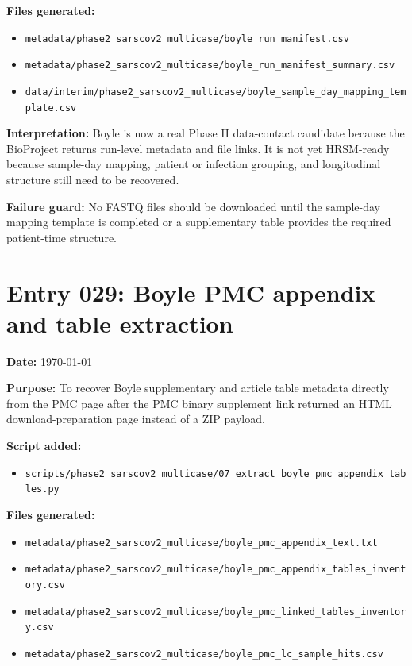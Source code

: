 \textbf{Files generated:}
\begin{itemize}
    \item \texttt{metadata/phase2\_sarscov2\_multicase/boyle\_run\_manifest.csv}
    \item \texttt{metadata/phase2\_sarscov2\_multicase/boyle\_run\_manifest\_summary.csv}
    \item \texttt{data/interim/phase2\_sarscov2\_multicase/boyle\_sample\_day\_mapping\_template.csv}
\end{itemize}

\textbf{Interpretation:} Boyle is now a real Phase II data-contact candidate because the BioProject returns run-level metadata and file links. It is not yet HRSM-ready because sample-day mapping, patient or infection grouping, and longitudinal structure still need to be recovered.

\textbf{Failure guard:} No FASTQ files should be downloaded until the sample-day mapping template is completed or a supplementary table provides the required patient-time structure.

\section*{Entry 029: Boyle PMC appendix and table extraction}

\textbf{Date:} \today

\textbf{Purpose:} To recover Boyle supplementary and article table metadata directly from the PMC page after the PMC binary supplement link returned an HTML download-preparation page instead of a ZIP payload.

\textbf{Script added:}
\begin{itemize}
    \item \texttt{scripts/phase2\_sarscov2\_multicase/07\_extract\_boyle\_pmc\_appendix\_tables.py}
\end{itemize}

\textbf{Files generated:}
\begin{itemize}
    \item \texttt{metadata/phase2\_sarscov2\_multicase/boyle\_pmc\_appendix\_text.txt}
    \item \texttt{metadata/phase2\_sarscov2\_multicase/boyle\_pmc\_appendix\_tables\_inventory.csv}
    \item \texttt{metadata/phase2\_sarscov2\_multicase/boyle\_pmc\_linked\_tables\_inventory.csv}
    \item \texttt{metadata/phase2\_sarscov2\_multicase/boyle\_pmc\_lc\_sample\_hits.csv}
\end{itemize}


